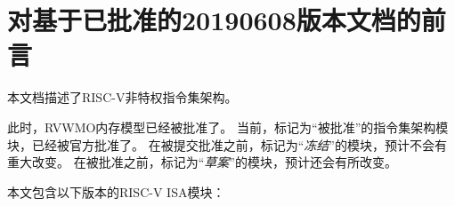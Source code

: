 \FloatBarrier

\section*{对基于已批准的20190608版本文档的前言}

本文档描述了RISC-V非特权指令集架构。


此时，RVWMO内存模型已经被批准了。
当前，标记为“被批准”的指令集架构模块，已经被官方批准了。
在被提交批准之前，标记为“{\em 冻结}”的模块，预计不会有重大改变。
在被批准之前，标记为“{\em 草案}”的模块，预计还会有所改变。


本文包含以下版本的RISC-V ISA模块：

